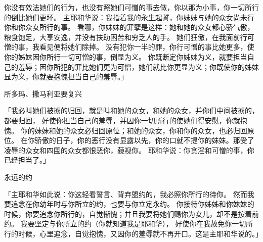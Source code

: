 {你没有效法她们的行为，也没有照她们可憎的事去做，你以那为小事，你一切所行的倒比她们更坏。
主耶和华说：我指着我的永生起誓，你妹妹{}与她的众女尚未行你和你众女所行的事。
看哪，你妹妹{}的罪孽是这样：她和她的众女都心骄气傲，粮食饱足，大享安逸，并没有扶助困苦和穷乏人的手。
她们狂傲，在我面前行可憎的事，我看见便将她们除掉。
没有犯你一半的罪，你行可憎的事比她更多，使你的姊妹因你所行一切可憎的事，倒显为义。
你既断定你姊妹为义，就要担当自己的羞辱；因你所犯的罪比她们更为可憎，她们就比你更显为义；你既使你的姊妹显为义，你就要抱愧担当自己的羞辱。」
\par }{\SH 所多玛、撒马利亚要复兴
\par }{\PP {}「我必叫她们被掳的归回，就是叫{}和她的众女，{}和她的众女，并你们中间被掳的，都要归回，
好使你担当自己的羞辱，并因你一切所行的使她们得安慰，你就抱愧。
你的妹妹{}和她的众女必归回原位；{}和她的众女，你和你的众女，也必归回原位。
在你骄傲的日子，你的恶行没有显露以先，你的口就不提你的妹妹{}。那受了凌辱的{}众女和{}四围{}的众女都恨恶你，藐视你。
耶和华说：你贪淫和可憎的事，你已经担当了。」
\par }{\SH 永远的约
\par }{\PP {}「主耶和华如此说：你这轻看誓言、背弃盟约的，我必照你所行的待你。
然而我要追念在你幼年时与你所立的约，也要与你立定永约。
你接待你姊姊和你妹妹的时候，你要追念你所行的，自觉惭愧；并且我要将她们赐你为女儿，却不是按着前约。
我要坚定与你所立的约（你就知道我是耶和华），
好使你在我赦免你一切所行的时候，心里追念，自觉抱愧，又因你的羞辱就不再开口。这是主耶和华说的。」

}
